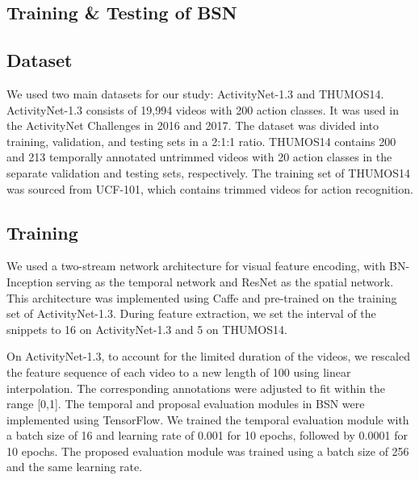 \subsection{Training \& Testing of BSN}
\subsection{Dataset}
We used two main datasets for our study: ActivityNet-1.3 and THUMOS14. ActivityNet-1.3 consists of 19,994 videos with 200 action classes. It was used in the ActivityNet Challenges in 2016 and 2017. The dataset was divided into training, validation, and testing sets in a 2:1:1 ratio. THUMOS14 contains 200 and 213 temporally annotated untrimmed videos with 20 action classes in the separate validation and testing sets, respectively. The training set of THUMOS14 was sourced from UCF-101, which contains trimmed videos for action recognition.

\subsection{Training}
We used a two-stream network architecture for visual feature encoding, with BN-Inception serving as the temporal network and ResNet as the spatial network. This architecture was implemented using Caffe and pre-trained on the training set of ActivityNet-1.3. During feature extraction, we set the interval of the snippets to 16 on ActivityNet-1.3 and 5 on THUMOS14.

On ActivityNet-1.3, to account for the limited duration of the videos, we rescaled the feature sequence of each video to a new length of 100 using linear interpolation. The corresponding annotations were  adjusted to fit within the range [0,1]. The temporal and proposal evaluation modules in BSN were implemented using TensorFlow. We trained the temporal evaluation module with a batch size of 16 and  learning rate of 0.001 for 10 epochs, followed by 0.0001 for 10 epochs. The proposed evaluation module was trained using a batch size of 256 and the same learning rate.
